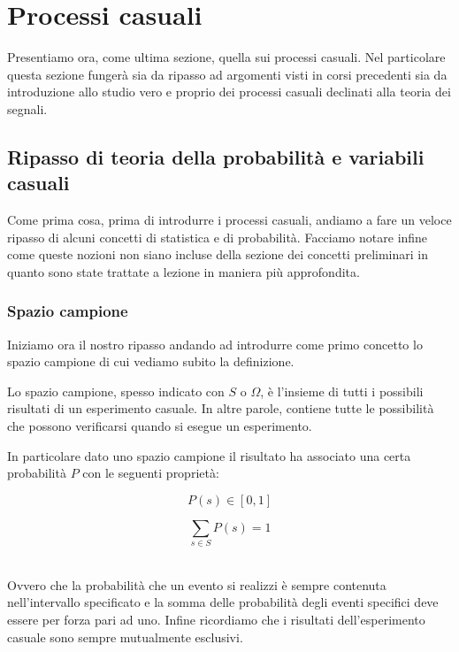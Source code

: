 \documentclass[../main.tex]{subfiles}
\begin{document}

\clearpage
\thispagestyle{empty}
\vspace*{7cm}
\section{Processi casuali}
\vspace*{1.5cm}

Presentiamo ora, come ultima sezione, quella sui processi casuali. Nel particolare questa sezione fungerà sia da ripasso ad argomenti visti in corsi precedenti sia da introduzione allo studio vero e proprio dei processi casuali declinati alla teoria dei segnali.  

\subsection{Ripasso di teoria della probabilità e variabili casuali}

Come prima cosa, prima di introdurre i processi casuali, andiamo a fare un veloce ripasso di alcuni concetti di statistica e di probabilità. Facciamo notare infine come queste nozioni non siano incluse della sezione dei concetti preliminari in quanto sono state trattate a lezione in maniera più approfondita.

\subsubsection{Spazio campione}

Iniziamo ora il nostro ripasso andando ad introdurre come primo concetto lo spazio campione di cui vediamo subito la definizione.

\begin{definition*}

Lo spazio campione, spesso indicato con $S$ o $\Omega$, è l'insieme di tutti i possibili risultati di un esperimento casuale. In altre parole, contiene tutte le possibilità che possono verificarsi quando si esegue un esperimento.
	
\end{definition*}

In particolare dato uno spazio campione il risultato ha associato una certa probabilità $P$ con le seguenti proprietà:

\[P(s) \in [0,1] \]

\[ \sum_{s \in S} P(s) = 1\]\

Ovvero che la probabilità che un evento si realizzi è sempre contenuta nell'intervallo specificato e la somma delle probabilità degli eventi specifici deve essere per forza pari ad uno. Infine ricordiamo che i risultati dell'esperimento casuale sono sempre mutualmente esclusivi.\\
\end{document}
